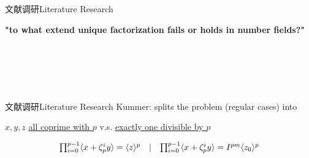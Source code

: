\documentclass[aspectratio=169]{beamer}
\begin{document}
    \begin{frame}{文献调研}{Literature Research}
    \begin{center}
    \textbf{"to what extend unique factorization fails or holds in number fields?"}
    \end{center}
    \\
    \\
    \\
    \\
    \end{frame}
    
    \begin{frame}{文献调研}{Literature Research}
    Kummer: splits the problem (regular cases) into \\
    \begin{center}
    $x,y,z$ \underline{all coprime with $p$} v.s. \underline{exactly one divisible by $p$}
    \end{center}
    \begin{equation}
    \notag
    \begin{matrix}
        \prod_{i=0}^{p-1}\langle x+\zeta_p^iy\rangle = \langle z\rangle^p & \mid & \prod_{i=0}^{p-1}\langle x+\zeta_p^iy\rangle = I^{pm} \langle z_0\rangle^p
    \end{matrix}
    \end{equation}
    \end{frame}
    
\end{document}
